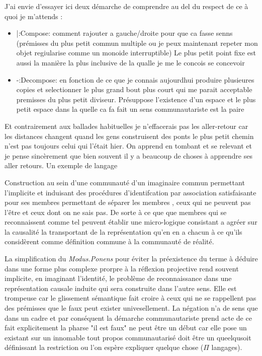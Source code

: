 \documentclass{article}
\begin{document}
J'ai envie d'essayer ici deux démarche de comprendre au del du respect de ce à quoi je m'attends : 
\begin{itemize}
 \item |:Compose: comment rajouter a gauche/droite pour que ca fasse senns (prémisses du plus petit commun multiple ou je peux maintenant repeter mon objet regiularise comme un monoide interruptible) Le plus petit point fixe est aussi la manière la plus inclusive de la qualle je me le concois se concevoir 
\item -:Decompose: en fonction de ce que je connais aujourdhui produire plusieures copies et selectionner le plus grand bout plus court qui me parait acceptable 
premisses du plus petit diviseur. Présuppose l'existence d'un espace et le plus petit espace dans la quelle ca fa fait un sens communautariste est la paire
\end{itemize}


Et contrairement aux ballades habituelles je n'effacerais pas les aller-retour  car les distances changent quand les gens construisent des ponts le plus petit chemin n'est pas toujours celui qui l'était hier. On apprend en tombant et se relevant et je pense sincèrement que bien souvent il y a beaucoup  de choses à apprendre ses aller retours. 
Un exemple  de langage



Construction au sein d'une communauté d'un imaginaire commun permettant l'implicite et induisant des procédures d'identifcation par association satisfaisante pour ses membres permettant de séparer les membres , ceux qui ne peuvent pas l'être et ceux dont on ne sais pas. De sorte à ce que que membres qui se reconnaissent comme tel peuvent établir une micro-logique consistant a agréer sur la causalité la transportant de la représentation qu'en en a chacun 
à ce qu'ils considèrent comme définition  commune  à la communauté de réalité.   

La simplification du \emph{Modus.Ponens} pour éviter la préexistence du terme à déduire dans une forme plus complexe prorpre à la réflexion projective rend souvent implicite, en imaginant l'identité, le problème de reconnaissance dans une représentation causale induite qui sera construite dans l'autre sens. 
Elle est trompeuse car le glissement sémantique fait croire à ceux qui ne se rappellent pas des prémisses que le faux peut exister univesellement. 
La négation n'a de sens que dans un cadre et par conséquent la démarche communautariste prend acte de ce fait explicitement la pharse "il est faux" ne peut être un début car elle pose un existant sur un innomable tout propos communautarisé doit être un queelqusoit définissant la restriction ou l'on espère expliquer quelque chose ($\Pi$ langages). 
\end{document}
